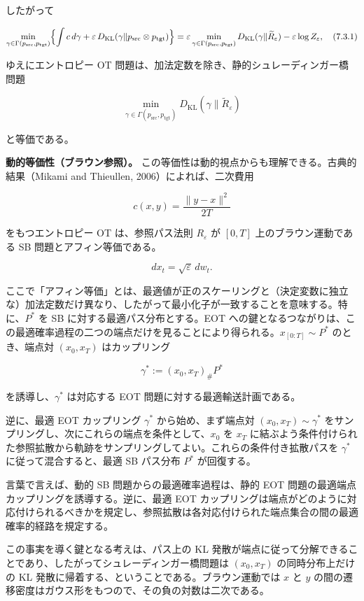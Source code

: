 したがって

\[
\min_{\gamma\in\Gamma(p_{\mathrm{src}},p_{\mathrm{tgt}})}
\Bigl\{\int c\,d\gamma+\varepsilon\,D_{\mathrm{KL}}(\gamma\|p_{\mathrm{src}}\otimes p_{\mathrm{tgt}})\Bigr\}
=
\varepsilon\min_{\gamma\in\Gamma(p_{\mathrm{src}},p_{\mathrm{tgt}})}D_{\mathrm{KL}}(\gamma\|\widetilde{R}_\varepsilon)
-\varepsilon\log Z_\varepsilon,
\quad (7.3.1)
\]


ゆえにエントロピー OT 問題は、加法定数を除き、静的シュレーディンガー橋問題

\[
\min_{\gamma\in\Gamma(p_{\mathrm{src}},p_{\mathrm{tgt}})}D_{\mathrm{KL}}(\gamma\|\widetilde{R}_\varepsilon)
\]


と等価である。

\textbf{動的等価性（ブラウン参照）。} この等価性は動的視点からも理解できる。古典的結果（Mikami and Thieullen, 2006）によれば、二次費用

\[
c(x,y)=\frac{\|y-x\|^2}{2T}
\]


をもつエントロピー OT は、参照パス法則 $R_\varepsilon$ が $[0,T]$ 上のブラウン運動である SB 問題とアフィン等価である。

\[
dx_t=\sqrt{\varepsilon}\,dw_t.
\]


ここで「アフィン等価」とは、最適値が正のスケーリングと（決定変数に独立な）加法定数だけ異なり、したがって最小化子が一致することを意味する。特に、$P^*$ を SB に対する最適パス分布とする。EOT への鍵となるつながりは、この最適確率過程の二つの端点だけを見ることにより得られる。$x_{[0:T]}\sim P^*$ のとき、端点対 $(x_0,x_T)$ はカップリング

\[
\gamma^*:=(x_0,x_T)_{\#}P^*
\]


を誘導し、$\gamma^*$ は対応する EOT 問題に対する最適輸送計画である。

逆に、最適 EOT カップリング $\gamma^*$ から始め、まず端点対 $(x_0,x_T)\sim\gamma^*$ をサンプリングし、次にこれらの端点を条件として、$x_0$ を $x_T$ に結ぶよう条件付けられた参照拡散から軌跡をサンプリングしてよい。これらの条件付き拡散パスを $\gamma^*$ に従って混合すると、最適 SB パス分布 $P^*$ が回復する。

言葉で言えば、動的 SB 問題からの最適確率過程は、静的 EOT 問題の最適端点カップリングを誘導する。逆に、最適 EOT カップリングは端点がどのように対応付けられるべきかを規定し、参照拡散は各対応付けられた端点集合の間の最適確率的経路を規定する。

この事実を導く鍵となる考えは、パス上の KL 発散が端点に従って分解できることであり、したがってシュレーディンガー橋問題は $(x_0,x_T)$ の同時分布上だけの KL 発散に帰着する、ということである。ブラウン運動では $x$ と $y$ の間の遷移密度はガウス形をもつので、その負の対数は二次である。

